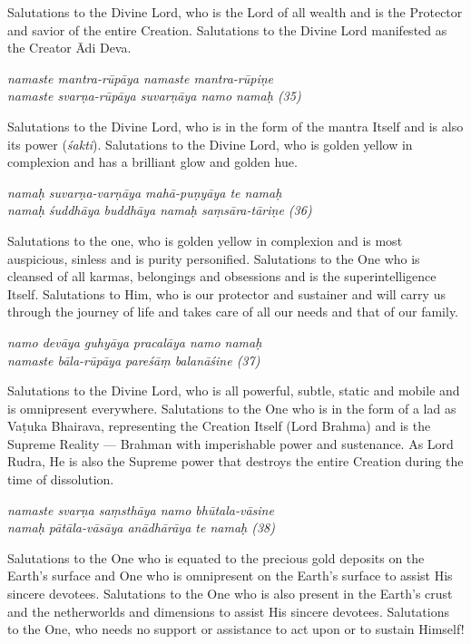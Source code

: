 \documentclass[11pt,oneside,a4paper]{article}
\newenvironment{shloka}[1]
  {\bigskip\center#1\varwidth{\linewidth}}
  {\endvarwidth\endcenter\bigskip}
\newcommand{\tl}[1]{\emph{#1}}
\begin{document}
Salutations to the Divine Lord, who is the Lord of all wealth and is
the Protector and savior of the entire Creation. Salutations to the Divine Lord
manifested as the Creator Ādi Deva.

\begin{shloka}\itshape
  namaste mantra-rūpāya namaste mantra-rūpiṇe\\
  namaste svarṇa-rūpāya suvarṇāya namo namaḥ (35)
\end{shloka}

Salutations to the Divine Lord, who is in the form of the mantra Itself and is
also its power (\tl{śakti}). Salutations to the Divine Lord, who is golden
yellow in complexion and has a brilliant glow and golden hue.

\begin{shloka}\itshape
  namaḥ suvarṇa-varṇāya mahā-puṇyāya te namaḥ\\
  namaḥ śuddhāya buddhāya namaḥ saṃsāra-tāriṇe (36)
\end{shloka}

Salutations to the one, who is golden yellow in complexion and is most
auspicious, sinless and is purity personified. Salutations to the One who is
cleansed of all karmas, belongings and obsessions and is the superintelligence
Itself. Salutations to Him, who is our protector and sustainer and will carry us
through the journey of life and takes care of all our needs and that of
our family.

\begin{shloka}\itshape
  namo devāya guhyāya pracalāya namo namaḥ\\
  namaste bāla-rūpāya pareśāṃ balanāśine (37)
\end{shloka}

Salutations to the Divine Lord, who is all powerful, subtle, static and mobile
and is omnipresent everywhere. Salutations to the One who is in the form of
a lad as Vaṭuka Bhairava, representing the Creation Itself (Lord Brahma) and is
the Supreme Reality — Brahman with imperishable power and sustenance. As Lord
Rudra, He is also the Supreme power that destroys the entire Creation during
the time of dissolution.

\begin{shloka}\itshape
  namaste svarṇa saṃsthāya namo bhūtala-vāsine\\
  namaḥ pātāla-vāsāya anādhārāya te namaḥ (38)
\end{shloka}

Salutations to the One who is equated to the precious gold deposits on
the Earth’s surface and One who is omnipresent on the Earth’s surface to assist
His sincere devotees. Salutations to the One who is also present in the Earth’s
crust and the netherworlds and dimensions to assist His sincere devotees.
Salutations to the One, who needs no support or assistance to act upon or to
sustain Himself!
\end{document}
